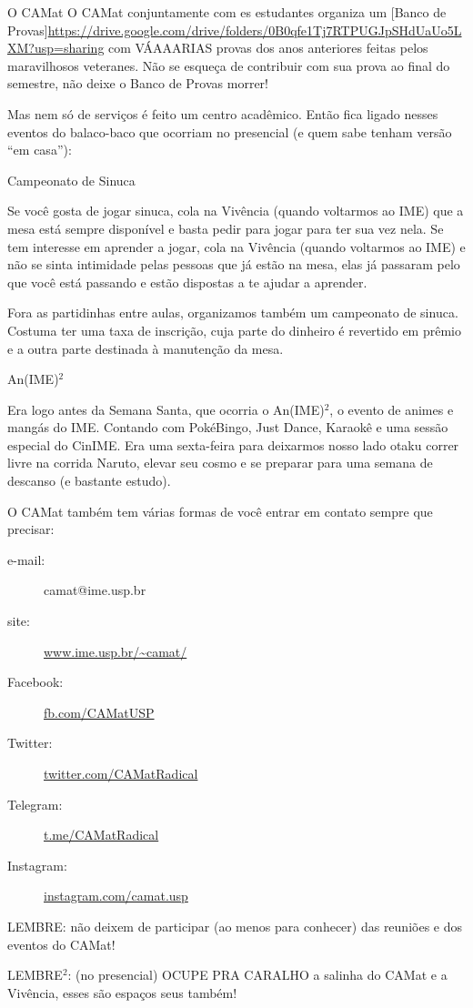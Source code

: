 \begin{secao}{O CAMat}
O CAMat conjuntamente com es estudantes organiza um
[Banco de Provas]\url{https://drive.google.com/drive/folders/0B0qfe1Tj7RTPUGJpSHdUaUo5LXM?usp=sharing}
com VÁAAARIAS provas dos anos anteriores feitas pelos maravilhosos veteranes.
Não se esqueça de contribuir com sua prova ao final do semestre, não
deixe o Banco de Provas morrer!

  
Mas nem só de serviços é feito um centro acadêmico. Então fica ligado nesses
eventos do balaco-baco que ocorriam no presencial (e quem sabe tenham versão “em casa”):

\begin{subsecao}{Campeonato de Sinuca}

Se você gosta de jogar sinuca, cola na Vivência (quando voltarmos ao IME) que
a mesa está sempre disponível e basta pedir para jogar para ter sua vez nela.
Se tem interesse em aprender a jogar, cola na Vivência (quando voltarmos ao IME)
e não se sinta intimidade pelas pessoas que já estão na mesa, elas já passaram pelo
que você está passando e estão dispostas a te ajudar a aprender.

Fora as partidinhas entre aulas, organizamos também um campeonato de sinuca. Costuma
ter uma taxa de inscrição, cuja parte do dinheiro é revertido em prêmio e a outra parte
destinada à manutenção da mesa.

\end{subsecao}

\begin{subsecao}{An(IME)$^2$}

Era logo antes da Semana Santa, que ocorria o An(IME)$^2$, o evento de animes e
mangás do IME. Contando com PokéBingo, Just Dance, Karaokê e uma sessão especial do CinIME.
Era uma sexta-feira para deixarmos nosso lado otaku correr livre na corrida Naruto,
elevar seu cosmo e se preparar para uma semana de descanso (e bastante estudo).

\end{subsecao}


O CAMat também tem várias formas de você entrar em contato sempre que precisar:

\begin{description}
\item [e-mail:] camat@ime.usp.br
\item [site:] \url{www.ime.usp.br/~camat/}
\item [Facebook:] \url{fb.com/CAMatUSP}
\item [Twitter:] \url{twitter.com/CAMatRadical}
\item [Telegram:] \url{t.me/CAMatRadical}
\item [Instagram:] \url{instagram.com/camat.usp}
\end{description}

LEMBRE: não deixem de participar (ao menos para conhecer) das reuniões e dos eventos do CAMat!

LEMBRE$^2$: (no presencial) OCUPE PRA CARALHO a salinha do CAMat e a Vivência,
esses são espaços seus também!

\end{secao}

